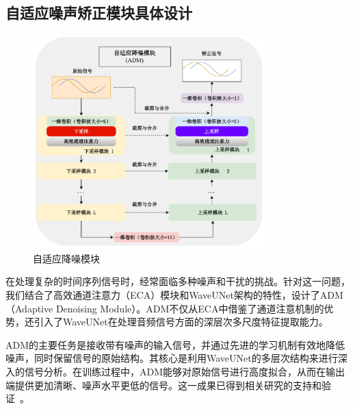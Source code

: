 

\subsection{自适应噪声矫正模块具体设计}\label{sec:background}

\begin{figure}
\centering
\includegraphics[width=0.8\textwidth]{Image/adm.pdf}
\caption{自适应降噪模块}
\label{fig:adm}
\end{figure}

在处理复杂的时间序列信号时，经常面临多种噪声和干扰的挑战。针对这一问题，我们结合了高效通道注意力（ECA）模块和WaveUNet架构的特性，设计了ADM（Adaptive Denoising Module）。ADM不仅从ECA中借鉴了通道注意机制的优势，还引入了WaveUNet在处理音频信号方面的深层次多尺度特征提取能力。

ADM的主要任务是接收带有噪声的输入信号，并通过先进的学习机制有效地降低噪声，同时保留信号的原始结构。其核心是利用WaveUNet的多层次结构来进行深入的信号分析。在训练过程中，ADM能够对原始信号进行高度拟合，从而在输出端提供更加清晰、噪声水平更低的信号。这一成果已得到相关研究的支持和验证~\cite{michelashvili2019speech}。


